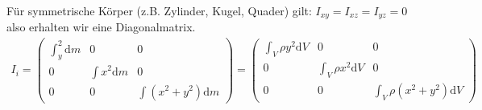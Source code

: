 \documentclass[a4paper, 12pt]{scrartcl}
\begin{document}
Für symmetrische Körper (z.B. Zylinder, Kugel, Quader) 
gilt: $I_{xy} = I_{xz} = I_{yz} = 0$ also erhalten wir eine Diagonalmatrix. 
\begin{align*}
    I_i 
    =
    \begin{pmatrix}
        \int_ y^2 \mathrm{d}m & 0 & 0 \\
        0 & \int x^2 \mathrm{d}m & 0 \\
        0 & 0 & \int (x^2 + y^2) \mathrm{d}m
    \end{pmatrix}
    =
    \begin{pmatrix}
        \int_V \rho y^2 \mathrm{d}V & 0 & 0 \\
        0 & \int_V \rho x^2 \mathrm{d}V & 0 \\
        0 & 0 & \int_V \rho (x^2 + y^2) \mathrm{d}V
    \end{pmatrix}
\end{align*}
\end{document}
